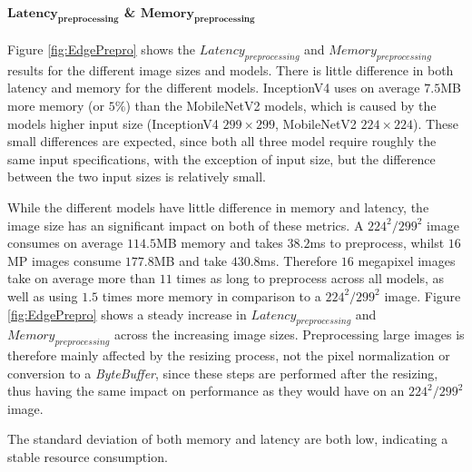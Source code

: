 \paragraph{$\mathbf{Latency_{preprocessing}}$ \& $\mathbf{Memory_{preprocessing}}$}
Figure \ref{fig:EdgePrepro} shows the $Latency_{preprocessing}$ and $Memory_{preprocessing}$ results for the different image sizes and models.
There is little difference in both latency and memory for the different models. 
InceptionV4 uses on average $7.5$MB more memory (or $5\%$) than the MobileNetV2 models, which is caused by the models higher input size (InceptionV4 $299\times299$, MobileNetV2 $224\times224$). 
These small differences are expected, since both all three model require roughly the same input specifications, with the exception of input size, but the difference between the two input sizes is relatively small.

While the different models have little difference in memory and latency, the image size has an significant impact on both of these metrics.
A $224^2/299^2$ image consumes on average $114.5$MB memory and takes $38.2$ms to preprocess, whilst  $16$MP images consume $177.8$MB and take $430.8$ms.
Therefore $16$ megapixel images take on average  more than $11$ times as long to preprocess across all models, as well as using $1.5$ times more memory in comparison to a $224^2/299^2$ image.
Figure \ref{fig:EdgePrepro} shows a steady increase in $Latency_{preprocessing}$ and $Memory_{preprocessing}$ across the increasing image sizes.
Preprocessing large images is therefore mainly affected by the resizing process, not the pixel normalization or conversion to a \emph{ByteBuffer}, since these steps are performed after the resizing, thus having the same impact on performance as they would have on an $224^2/299^2$ image.

The standard deviation of both memory and latency are both low, indicating a stable resource consumption.



